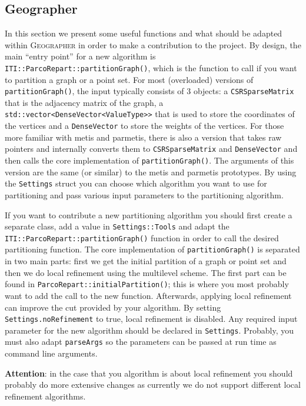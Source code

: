 \documentclass[a4paper,10pt]{article}
\newcommand{\geo}{\textsc{Geographer} }
\newcommand{\quot}[1]{``#1''}
\newcommand{\att}{\textbf{Attention}: }
\newcommand{\MI}[1]{\texttt{#1}}
\begin{document}
\clearpage


\subsection*{Geographer }

In this section we present some useful functions and what should be adapted within 
\geo in order to make a contribution to the project.
By design, the main \quot{entry point} for a new algorithm is \MI{ITI::ParcoRepart::partitionGraph()}, which
is the function to call if you want to partition a graph or a point set. 
For most (overloaded) versions of \MI{partitionGraph()}, 
the input typically consists of 3 objects: a \MI{CSRSparseMatrix} that is the adjacency 
matrix of the graph, 
a \MI{std::vector<DenseVector<ValueType>>} that is used to store the coordinates of the 
vertices and a \MI{DenseVector} to store the weights of the vertices.
For those more familiar with metis and parmetis, there is also a version that takes 
raw pointers and internally converts them to \MI{CSRSparseMatrix} and \MI{DenseVector} 
and then calls the core implementation of \MI{partitionGraph()}. 
The arguments of this version are the same (or similar) to the metis and parmetis prototypes.
By using the \MI{Settings} struct you can choose which algorithm you want to use for 
partitioning and pass various input parameters to the partitioning algorithm.

If you want to contribute a new partitioning algorithm
you should first create a separate class, add a value in \MI{Settings::Tools} and adapt the 
\MI{ITI::ParcoRepart::partitionGraph()} function in order to call the desired partitioning function.
The core implementation of \MI{partitionGraph()} is separated in two main parts: 
first we get the initial partition of a graph or point set and then we do local refinement using 
the multilevel scheme. 
The first part can be found in \MI{ParcoRepart::initialPartition()}; this is where you most probably
want to add the call to the new function. Afterwards, applying
local refinement can improve the cut provided by your algorithm.
By setting \MI{Settings.noRefinement} to true, local refinement is disabled.
Any required input parameter for the new algorithm should be declared in \MI{Settings}.
Probably, you must also adapt \MI{parseArgs} so the parameters can be passed at run time as 
command line arguments.

\att in the case that you algorithm is about local refinement you should probably do more extensive
changes as currently we do not support different local refinement algorithms.
\end{document}
